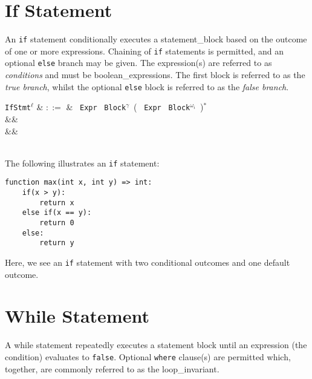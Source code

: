 
\section{If Statement}
\label{c_stmts_if}
An \lstinline{if} statement conditionally executes a \gls{statement_block} based on the outcome of one or more expressions.  Chaining of \lstinline{if} statements is permitted, and an optional \lstinline{else} branch may be given.  The expression(s) are referred to as {\em conditions} and must be \gls{boolean_expression}s.  The first block is referred to as the {\em true branch}, whilst the optional \lstinline{else} block is referred to as the {\em false branch}.

\begin{syntax}
  \verb+IfStmt+$^\ell$ & $::=$ & \ \verb+Expr+\ \token{:}
  \verb+Block+$^\gamma$\ \big(  \ \verb+Expr+\ \token{:}
  \verb+Block+$^{\omega_i}$\ \big)$^*$ \\
&& \\
&&\\
\\
\end{syntax}

\noindent The following illustrates an \lstinline{if} statement:

\begin{lstlisting}
function max(int x, int y) => int:
    if(x > y):
        return x
    else if(x == y):
        return 0
    else:
        return y
\end{lstlisting}
Here, we see an \lstinline{if} statement with two conditional outcomes
and one default outcome.


\section{While Statement}
\label{c_stmts_while}
A while statement repeatedly executes a statement block until an expression (the condition) evaluates to \lstinline{false}.  Optional \lstinline{where} clause(s) are permitted which, together, are commonly referred to as the \gls{loop_invariant}.  


